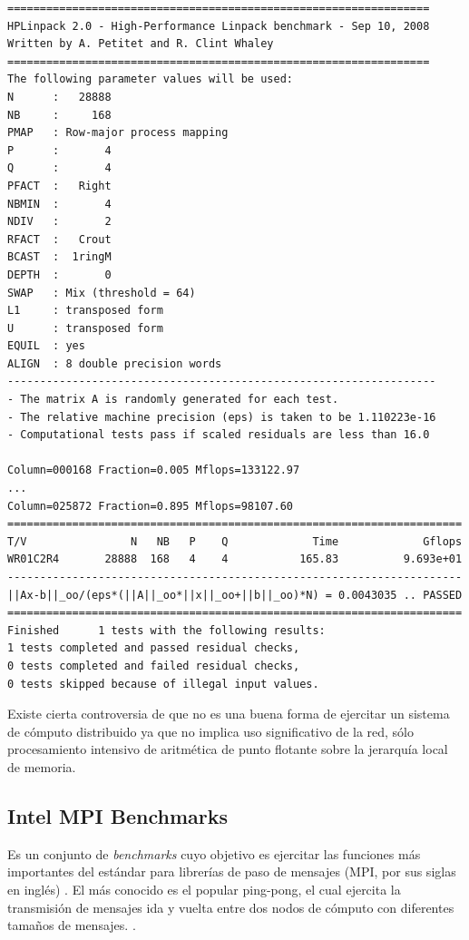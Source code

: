 \documentclass[a4paper]{report}
\begin{document}
{\small
\begin{verbatim}
=================================================================
HPLinpack 2.0 - High-Performance Linpack benchmark - Sep 10, 2008
Written by A. Petitet and R. Clint Whaley
=================================================================
The following parameter values will be used:
N      :   28888
NB     :     168
PMAP   : Row-major process mapping
P      :       4
Q      :       4
PFACT  :   Right
NBMIN  :       4
NDIV   :       2
RFACT  :   Crout
BCAST  :  1ringM
DEPTH  :       0
SWAP   : Mix (threshold = 64)
L1     : transposed form
U      : transposed form
EQUIL  : yes
ALIGN  : 8 double precision words
------------------------------------------------------------------
- The matrix A is randomly generated for each test.
- The relative machine precision (eps) is taken to be 1.110223e-16
- Computational tests pass if scaled residuals are less than 16.0

Column=000168 Fraction=0.005 Mflops=133122.97
...
Column=025872 Fraction=0.895 Mflops=98107.60
======================================================================
T/V                N   NB   P    Q             Time             Gflops
WR01C2R4       28888  168   4    4           165.83          9.693e+01
----------------------------------------------------------------------
||Ax-b||_oo/(eps*(||A||_oo*||x||_oo+||b||_oo)*N) = 0.0043035 .. PASSED
======================================================================
Finished      1 tests with the following results:
1 tests completed and passed residual checks,
0 tests completed and failed residual checks,
0 tests skipped because of illegal input values.
\end{verbatim}
}

\bigskip

Existe cierta controversia de que no es una buena forma de ejercitar un
sistema de cómputo distribuido ya que no implica uso significativo de la
red, sólo procesamiento intensivo de aritmética de punto flotante
sobre la jerarquía local de memoria.

\subsection{Intel MPI Benchmarks}

Es un conjunto de {\it benchmarks} cuyo objetivo es ejercitar las funciones
más importantes del estándar para librerías de paso de mensajes (MPI, por sus siglas en inglés) \cite{mpi}.
El más conocido es el popular ping-pong, el cual ejercita la transmisión de mensajes ida y vuelta entre dos nodos de
cómputo con diferentes tamaños de mensajes. \cite{latency}.
\end{document}
